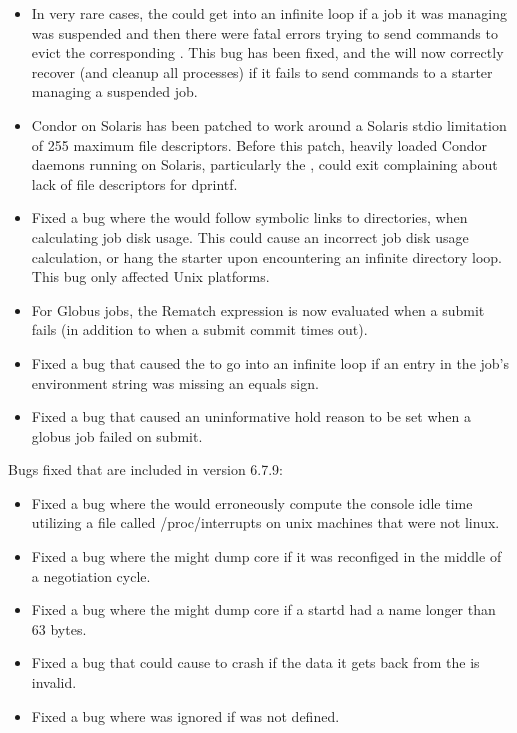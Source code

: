 \begin{itemize}

\item In very rare cases, the  could get into an
infinite loop if a job it was managing was suspended and then there
were fatal errors trying to send commands to evict the corresponding
.
This bug has been fixed, and the  will now correctly
recover (and cleanup all processes) if it fails to send commands to a
starter managing a suspended job.

\item Condor on Solaris has been patched to work around a Solaris stdio
limitation of 255 maximum file descriptors.  Before this patch, heavily
loaded Condor daemons running on Solaris, particularly the ,
could exit complaining about lack of file descriptors for dprintf.

\item Fixed a bug where the  would follow symbolic links to
directories, when calculating job disk usage.  This could cause an incorrect
job disk usage calculation, or hang the starter upon encountering an infinite
directory loop.  This bug only affected Unix platforms.

\item For Globus jobs, the Rematch expression is now evaluated when a
submit fails (in addition to when a submit commit times out).

\item Fixed a bug that caused the  to go into an
infinite loop if an entry in the job's environment string was missing
an equals sign.

\item Fixed a bug that caused an uninformative hold reason to be set when 
a globus job failed on submit.

\end{itemize}

\noindent Bugs fixed that are included in version 6.7.9:

\begin{itemize}

\item Fixed a bug where the  would erroneously compute the 
console idle time utilizing a file called /proc/interrupts on unix machines
that were not linux. 

\item Fixed a bug where the  might dump core if it was
reconfiged in the middle of a negotiation cycle.

\item Fixed a bug where the  might dump core if a startd
had a name longer than 63 bytes. 

\item Fixed a bug that could cause  to crash if the
data it gets back from the  is invalid.

\item Fixed a bug where
 was ignored if 
 was not defined.

\end{itemize}

